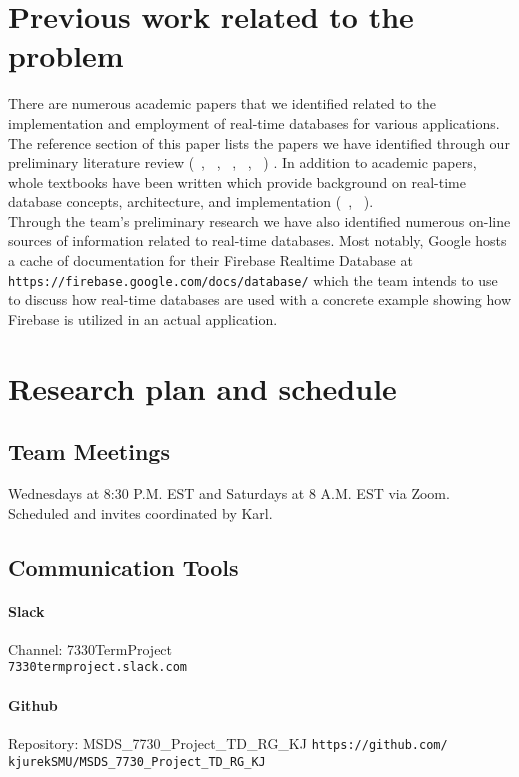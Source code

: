 \documentclass[conference]{IEEEtran}
\begin{document}
\section{Previous work related to the problem}
There are numerous academic papers that we identified related to the implementation and employment of real-time databases for various applications. The reference section of this paper lists the papers we have identified through our preliminary literature review (~\cite{a1}, ~\cite{a2}, ~\cite{a3}, ~\cite{a4}, ~\cite{a7}) . In addition to academic papers, whole textbooks have been written which provide background on real-time database concepts, architecture, and implementation (~\cite{a5}, ~\cite{a6}).\\
\indent Through the team's preliminary research we have also identified numerous on-line sources of information related to real-time databases. Most notably, Google hosts a cache of documentation for their Firebase Realtime Database at \texttt{https://firebase.google.com/docs/database/} which the team intends to use to discuss how real-time databases are used with a concrete example showing how Firebase is utilized in an actual application.

\section{Research plan and schedule}
\subsection{Team Meetings}
Wednesdays at 8:30 P.M. EST  and Saturdays at 8 A.M. EST via Zoom. Scheduled and invites coordinated by Karl.
\subsection{Communication Tools}
\paragraph{Slack} 
\begin{center}
Channel: 7330TermProject\\
\texttt{7330termproject.slack.com}\\
\end{center}
\paragraph{Github} 
\begin{center}
Repository: MSDS\_7730\_Project\_TD\_RG\_KJ
\texttt{https://github.com/}\\
 \texttt{kjurekSMU/MSDS\_7730\_Project\_TD\_RG\_KJ}
\end{center} 
\end{document}
